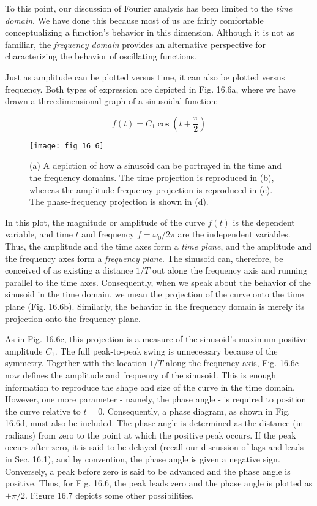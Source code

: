 \documentclass[../main.tex]{subfiles}
\begin{document}
\noindent To this point, our discussion of Fourier analysis has been limited to the \textit{time domain}. We
have done this because most of us are fairly comfortable conceptualizing a function's
behavior in this dimension. Although it is not as familiar, the \textit{frequency domain} provides an
alternative perspective for characterizing the behavior of oscillating functions.

Just as amplitude can be plotted versus time, it can also be plotted versus frequency.
Both types of expression are depicted in Fig. 16.6a, where we have drawn a threedimensional graph of a sinusoidal function:

\begin{equation}
	f(t) = C_1 \cos(t + \frac{\pi}{2})
\end{equation} 

\begin{figure}[H] 
	\centering
	\texttt{[image: fig\_16\_6]}
	\caption{\textsf{(a) A depiction of how a sinusoid can be portrayed in the time and the frequency domains. The
	time projection is reproduced in (b), whereas the amplitude-frequency projection is reproduced in
	(c). The phase-frequency projection is shown in (d).}}
	\label{fig:fig_16_6}
\end{figure}

\noindent In this plot, the magnitude or amplitude of the curve $f(t)$ is the dependent variable, and time $t$
and frequency $f = \omega_0 / 2 \pi$ are the independent variables. Thus, the amplitude and the time
axes form a \textit{time plane}, and the amplitude and the frequency axes form a \textit{frequency plane}.
The sinusoid can, therefore, be conceived of as existing a distance $1/T$ out along the frequency axis and running parallel to the time axes. Consequently, when we speak about the
behavior of the sinusoid in the time domain, we mean the projection of the curve onto the
time plane (Fig. 16.6b). Similarly, the behavior in the frequency domain is merely its projection onto the frequency plane.

As in Fig. 16.6c, this projection is a measure of the sinusoid's maximum positive
amplitude $C_1$. The full peak-to-peak swing is unnecessary because of the symmetry.
Together with the location $1/T$ along the frequency axis, Fig. 16.6c now defines the
amplitude and frequency of the sinusoid. This is enough information to reproduce the
shape and size of the curve in the time domain. However, one more parameter - namely,
the phase angle - is required to position the curve relative to $t = 0$. Consequently, a
phase diagram, as shown in Fig. 16.6d, must also be included. The phase angle is determined as the distance (in radians) from zero to the point at which the positive peak
occurs. If the peak occurs after zero, it is said to be delayed (recall our discussion of lags
and leads in Sec. 16.1), and by convention, the phase angle is given a negative sign.
Conversely, a peak before zero is said to be advanced and the phase angle is positive.
Thus, for Fig. 16.6, the peak leads zero and the phase angle is plotted as $+\pi / 2$. Figure 16.7 depicts some other possibilities.
\end{document}

